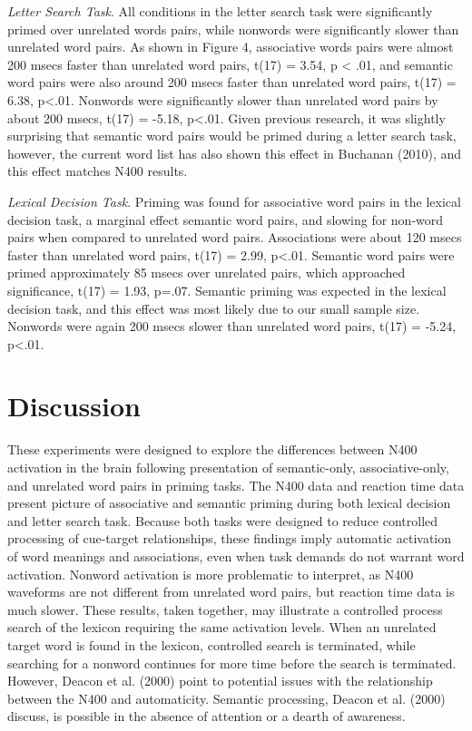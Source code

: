 \documentclass[english,man]{apa6}
\theoremstyle{definition}
\theoremstyle{definition}
\theoremstyle{definition}
\theoremstyle{remark}
\begin{document}
\emph{Letter Search Task}. All conditions in the letter search task were
significantly primed over unrelated words pairs, while nonwords were
significantly slower than unrelated word pairs. As shown in Figure 4,
associative words pairs were almost 200 msecs faster than unrelated word
pairs, t(17) = 3.54, p \textless{} .01, and semantic word pairs were
also around 200 msecs faster than unrelated word pairs, t(17) = 6.38,
p\textless{}.01. Nonwords were significantly slower than unrelated word
pairs by about 200 msecs, t(17) = -5.18, p\textless{}.01. Given previous
research, it was slightly surprising that semantic word pairs would be
primed during a letter search task, however, the current word list has
also shown this effect in Buchanan (2010), and this effect matches N400
results.

\emph{Lexical Decision Task}. Priming was found for associative word
pairs in the lexical decision task, a marginal effect semantic word
pairs, and slowing for non-word pairs when compared to unrelated word
pairs. Associations were about 120 msecs faster than unrelated word
pairs, t(17) = 2.99, p\textless{}.01. Semantic word pairs were primed
approximately 85 msecs over unrelated pairs, which approached
significance, t(17) = 1.93, p=.07. Semantic priming was expected in the
lexical decision task, and this effect was most likely due to our small
sample size. Nonwords were again 200 msecs slower than unrelated word
pairs, t(17) = -5.24, p\textless{}.01.

\section{Discussion}\label{discussion}

These experiments were designed to explore the differences between N400
activation in the brain following presentation of semantic-only,
associative-only, and unrelated word pairs in priming tasks. The N400
data and reaction time data present picture of associative and semantic
priming during both lexical decision and letter search task. Because
both tasks were designed to reduce controlled processing of cue-target
relationships, these findings imply automatic activation of word
meanings and associations, even when task demands do not warrant word
activation. Nonword activation is more problematic to interpret, as N400
waveforms are not different from unrelated word pairs, but reaction time
data is much slower. These results, taken together, may illustrate a
controlled process search of the lexicon requiring the same activation
levels. When an unrelated target word is found in the lexicon,
controlled search is terminated, while searching for a nonword continues
for more time before the search is terminated. However, Deacon et al.
(2000) point to potential issues with the relationship between the N400
and automaticity. Semantic processing, Deacon et al. (2000) discuss, is
possible in the absence of attention or a dearth of awareness.
\end{document}
